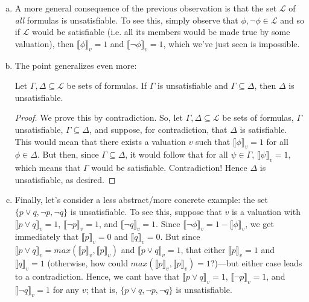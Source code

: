 \begin{enumerate}[\thesection.1]
\begin{enumerate}[(a)]
			\item A more general consequence of the previous observation is that the set $\mathcal{L}$ of \emph{all} formulas is unsatisfiable. To see this, simply observe that $\phi,\neg\phi\in\mathcal{L}$ and so if $\mathcal{L}$ would be satisfiable (i.e. all its members would be made true by some valuation), then $\llbracket\phi\rrbracket_v=1$ and $\llbracket\neg \phi\rrbracket_v=1$, which we've just seen is impossible.
			
			\item The point generalizes even more:
			
			\begin{proposition}
			Let $\Gamma,\Delta\subseteq\mathcal{L}$ be sets of formulas. If $\Gamma$ is unsatisfiable and $\Gamma\subseteq \Delta$, then $\Delta$ is unsatisfiable.
			\end{proposition}
			\begin{proof}
			We prove this by contradiction. So, let $\Gamma,\Delta\subseteq\mathcal{L}$ be sets of formulas, $\Gamma$ unsatisfiable, $\Gamma\subseteq \Delta$, and suppose, for contradiction, that $\Delta$ is satisfiable. This would mean that there exists a valuation $v$ such that $\llbracket\phi\rrbracket_v=1$ for all $\phi\in\Delta$. But then, since $\Gamma\subseteq\Delta$, it would follow that for all $\psi\in\Gamma$, $\llbracket\psi\rrbracket_v=1$, which means that $\Gamma$ would be satisfiable. Contradiction! Hence $\Delta$ is unsatisfiable, as desired.
		\end{proof}
		
		
			\item Finally, let's consider a less abstract/more concrete example: the set $\{p\lor q, \neg p, \neg q\}$ is unsatisfiable. To see this, suppose that $v$ is a valuation with $\llbracket p\lor q\rrbracket_v=1$, $\llbracket\neg p\rrbracket_v=1$, and $\llbracket\neg q\rrbracket_v=1$. Since $\llbracket\neg\phi\rrbracket_v=1-\llbracket\phi\rrbracket_v$, we get immediately that  $\llbracket p\rrbracket_v=0$ and $\llbracket q\rrbracket_v=0$. But since $\llbracket p\lor q\rrbracket_v=max(\llbracket p\rrbracket_v, \llbracket p\rrbracket_v)$ and  $\llbracket p\lor q\rrbracket_v=1$, that either $\llbracket p\rrbracket_v=1$ and $\llbracket q\rrbracket_v=1$ (otherwise, how could $max(\llbracket p\rrbracket_v, \llbracket p\rrbracket_v)=1$?)---but either case leads to a contradiction. Hence, we cant have that  $\llbracket p\lor q\rrbracket_v=1$, $\llbracket\neg p\rrbracket_v=1$, and $\llbracket\neg q\rrbracket_v=1$ for any $v$; that is, $\{p\lor q, \neg p, \neg q\}$ is unsatisfiable.
		

\end{enumerate}
\end{enumerate}

